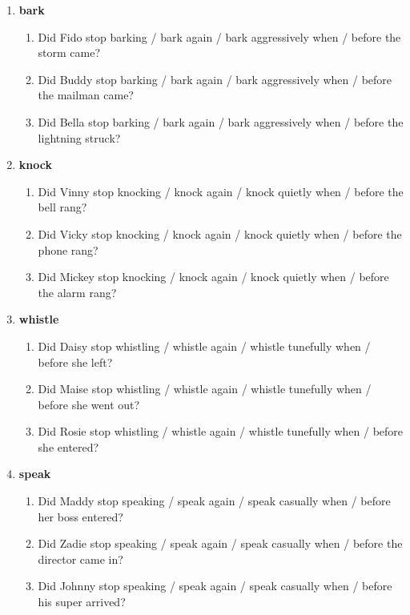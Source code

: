 \documentclass[a4paper,12pt]{article}
\newcommand{\6}{\mbox{$[\hspace*{-.6mm}[$}}
\newcommand{\9}{\mbox{$]\hspace*{-.6mm}]$}}
\begin{document}
\begin{enumerate}[leftmargin=3ex,itemsep=-4pt]
\item {\bf bark}
\begin{enumerate}[leftmargin=2ex,itemsep=-4pt]

\item Did Fido stop barking	 / bark again / bark aggressively	when / before the storm came?
\item Did Buddy stop barking / bark again / bark aggressively when /	before the mailman came?
\item Did Bella stop barking / bark again / bark aggressively	when / before the lightning struck?
\end{enumerate}


\item {\bf knock}
\begin{enumerate}[leftmargin=2ex,itemsep=-4pt]
\item Did Vinny stop knocking / knock again	 / knock quietly	when / before the bell rang?
\item Did Vicky stop knocking / knock again	 / knock quietly	when / before the phone rang?
\item Did Mickey stop knocking	 / knock again / knock quietly	when / before the alarm rang?
\end{enumerate}

\item {\bf whistle}
\begin{enumerate}[leftmargin=2ex,itemsep=-4pt]
\item  Did Daisy stop whistling	 / whistle again / whistle tunefully when /	before she left?
\item Did Maise stop whistling	/ whistle again	 / whistle tunefully when /	before she went out?
\item Did Rosie stop whistling / whistle again	/ whistle tunefully	when / before she entered?
\end{enumerate}


\item {\bf speak}
\begin{enumerate}[leftmargin=2ex,itemsep=-4pt]
\item Did Maddy stop speaking / speak again	/ speak casually when /	before her boss entered?
\item Did Zadie stop speaking	/ speak again	/ speak casually when / before the director came in?
\item Did Johnny stop speaking / speak again	/ speak casually when / before his super arrived?
\end{enumerate}



\end{enumerate}
\end{document}
